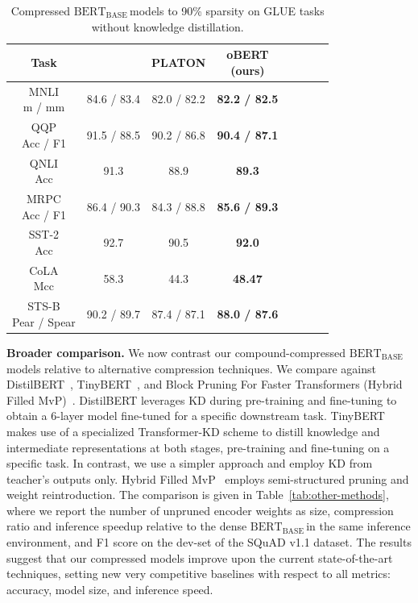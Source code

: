 \documentclass[11pt]{article}
\newcommand{\bert}{$\textrm{BERT}_{\textrm{BASE}}\,$}
\begin{document}
\begin{table}[h!]
    \caption{Compressed \bert models to 90\% sparsity on GLUE tasks without knowledge distillation.}
    \label{tab:vs_platon}
    \centering
    {\small
    \begin{tabular}{cc|cccccc}
    \toprule 
    Task & \makecell{\bert} &  PLATON & \makecell{oBERT\\(ours)} \\
    \midrule
    \makecell{MNLI\\m / mm} & 84.6 / 83.4 & 82.0 / 82.2 & \textbf{82.2 / 82.5} \\
    \midrule
    \makecell{QQP\\Acc / F1} & 91.5 / 88.5 & 90.2 / 86.8 & \textbf{90.4 / 87.1} \\ 
    \midrule
    \makecell{QNLI\\Acc} & 91.3 & 88.9 & \textbf{89.3} \\ 
    \midrule
    \makecell{MRPC\\Acc / F1} & 86.4 / 90.3 & 84.3 / 88.8 & \textbf{85.6 / 89.3} \\ 
    \midrule
    \makecell{SST-2\\Acc} & 92.7 & 90.5 & \textbf{92.0} \\
    \midrule
    \makecell{CoLA\\Mcc} & 58.3 & 44.3 & \textbf{48.47} \\
    \midrule
    \makecell{STS-B\\Pear / Spear} & 90.2 / 89.7 & 87.4 / 87.1 & \textbf{88.0 / 87.6} \\
    \bottomrule
    \end{tabular}
    }
\end{table}

\noindent\textbf{Broader comparison.} 
We now contrast our compound-compressed \bert models relative to alternative compression techniques. We compare against DistilBERT~\cite{Sanh2019DistilBERTAD}, TinyBERT~\cite{Jiao2020TinyBERTDB}, and Block Pruning For Faster Transformers (Hybrid Filled MvP)~\cite{lagunas21block}. 
DistilBERT leverages KD during pre-training and fine-tuning to obtain a 6-layer model fine-tuned for a specific downstream task. TinyBERT makes use of a specialized Transformer-KD scheme to distill knowledge and intermediate representations at both stages, pre-training and fine-tuning on a specific task. In contrast, we use a simpler approach and employ KD from teacher's outputs only. Hybrid Filled MvP~\cite{lagunas21block} employs semi-structured pruning and weight reintroduction. The comparison is given in Table~\ref{tab:other-methods}, where we report the number of unpruned encoder weights as size, compression ratio and inference speedup relative to the dense \bert in the same inference environment, and F1 score on the dev-set of the SQuAD v1.1 dataset. The results suggest that our compressed models improve upon the current state-of-the-art techniques, setting new very competitive baselines with respect to all metrics: accuracy, model size, and inference speed. 
\end{document}
